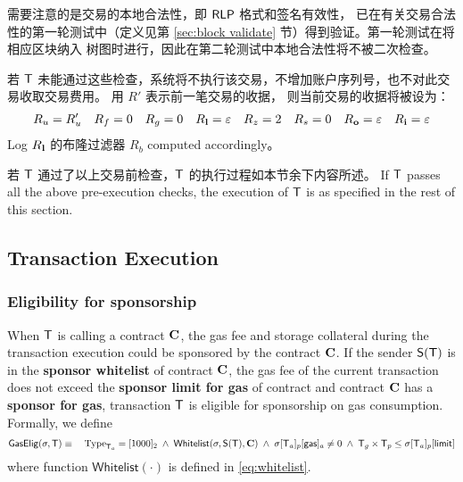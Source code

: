 需要注意的是交易的本地合法性，即 $\mathsf{RLP}$ 格式和签名有效性，
已在有关交易合法性的第一轮测试中（定义见第 \ref{sec:block validate} 节）得到验证。第一轮测试在将相应区块纳入 \name 树图时进行，因此在第二轮测试中本地合法性将不被二次检查。

若 $\textsf{T}$ 未能通过这些检查，系统将不执行该交易，不增加账户序列号，也不对此交易收取交易费用。
用 $R'$ 表示前一笔交易的收据，
则当前交易的收据将被设为：
\begin{align}
	R_u=R'_u && R_f=0 && R_g=0 && R_{\bf l}=\mathbb{\varepsilon} && R_z=2 && R_s=0 && R_{\bf o}=\mathbb{\varepsilon} && R_{\bf i}=\mathbb{\varepsilon}
\end{align}
%
Log $R_{\bf l}$ 的布隆过滤器 $R_b$ computed accordingly。

若 $\textsf{T}$ 通过了以上交易前检查，$\textsf{T}$ 的执行过程如本节余下内容所述。
If $\textsf{T}$ passes all the above pre-execution checks, the execution of $\textsf{T}$ is as specified in the rest of this section.

\subsection{Transaction Execution}

\subsubsection{Eligibility for sponsorship}

When $\textsf{T}$ is calling a contract $\mathbf{C}$, the gas fee and storage collateral during the transaction execution could be sponsored by the contract $\mathbf{C}$. If the sender $\mathsf{S}{\left({\textsf{T}} \right)}$ is in the {\bf sponsor whitelist} of contract $\mathbf{C}$, the gas fee of the current transaction does not exceed the {\bf sponsor limit for gas} of contract and contract $\mathbf{C}$ has a {\bf sponsor for gas}, transaction $\textsf{T}$ is eligible for sponsorship on gas consumption. Formally, we define 
\begin{align}
	\mathsf{GasElig}(\mathbf{\sigma},\textsf{T})\equiv \quad \mathrm{Type}_{\textsf{T}_a}=[1000]_2 \;\wedge\; \mathsf{Whitelist}(\mathbf{\sigma},\mathsf{S}{\left({\textsf{T}} \right)},\mathbf{C}) \;\wedge\; \mathbf{\sigma}[\textsf{T}_a]_p[\mathsf{gas}]_a\neq 0 \;\wedge\; \textsf{T}_g\times\textsf{T}_p \le \mathbf{\sigma}[\textsf{T}_a]_p[\mathsf{limit}] 
\end{align}
where function $\mathsf{Whitelist}(\cdot)$ is defined in \cref{eq:whitelist}. 

